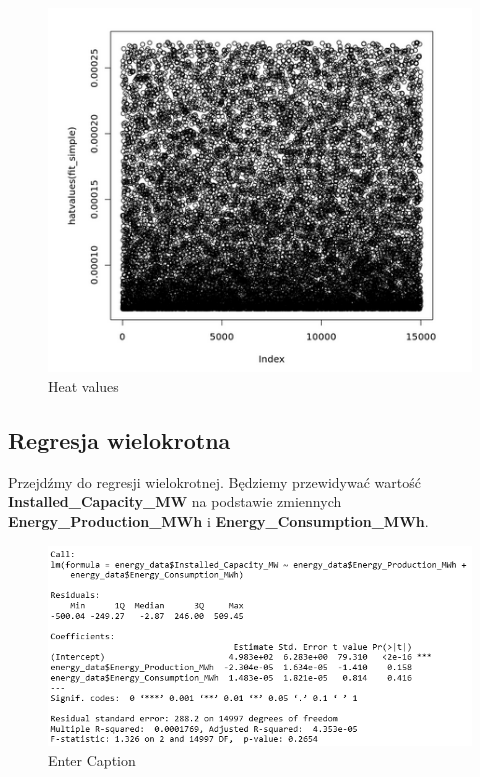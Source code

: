 \begin{figure}[H]
    \centering
    \includegraphics[width=0.9\linewidth]{lab1/obraz6.png}
    \caption{Heat values}
    \label{fig:heat_values}
\end{figure}

\subsection{Regresja wielokrotna}
Przejdźmy do regresji wielokrotnej. Będziemy przewidywać wartość \textbf{Installed\_Capacity\_MW} na podstawie zmiennych \textbf{Energy\_Production\_MWh} i \textbf{Energy\_Consumption\_MWh}.


\begin{figure}[H]
    \centering
    \includegraphics[width=1\linewidth]{lab1/obraz9.png}
    \caption{Enter Caption}
    \label{fig:enter-label}
\end{figure}

